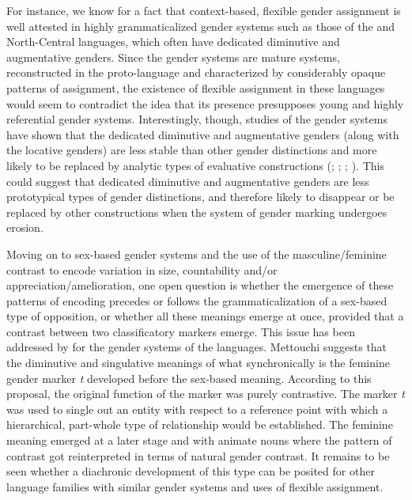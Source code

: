 \documentclass[output=collectionpaper]{langsci/langscibook}
\begin{document}
For instance, we know for a fact that context-based, flexible gender assignment is well attested in highly grammaticalized gender systems such as those of the  and North-Central  languages, which often have dedicated diminutive and augmentative genders. Since the  gender systems are mature systems, reconstructed in the proto-language and characterized by considerably opaque patterns of assignment, the existence of flexible assignment in these languages would seem to contradict the idea that its presence presupposes young and highly referential gender systems. Interestingly, though, studies of the  gender systems have shown that the dedicated diminutive and augmentative genders (along with the locative genders) are less stable than other gender distinctions and more likely to be replaced by analytic types of evaluative constructions (\citealt{Creissels1999}; \citealt{Gueldemann1999}; \citealt{DiGarbo2014}; \citealt{Verkerk2014}). This could suggest that dedicated diminutive and augmentative genders are less prototypical types of gender distinctions, and therefore likely to disappear or be replaced by other constructions when the system of gender marking undergoes erosion.

Moving on to sex-based gender systems and the use of the masculine/feminine contrast to encode variation in size, countability and/or appreciation/amelioration, one open question is whether the emergence of these patterns of encoding precedes or follows the grammaticalization of a sex-based type of opposition, or whether all these meanings emerge at once, provided that a contrast between two classificatory markers emerge. This issue has been addressed by \cite{Mettouchi2000} for the gender systems of the  languages. Mettouchi suggests that the diminutive and singulative meanings of what synchronically is the feminine gender marker \textit{t} developed before the sex-based meaning. According to this proposal, the original function of the marker was purely contrastive. The marker \textit{t} was used to single out an entity with respect to a reference point with which a hierarchical, part-whole type of relationship would be established. The feminine meaning emerged at a later stage and with animate nouns where the pattern of contrast got reinterpreted in terms of natural gender contrast. It remains to be seen whether a diachronic development of this type can be posited for other language families with similar gender systems and uses of flexible assignment.
\end{document}
